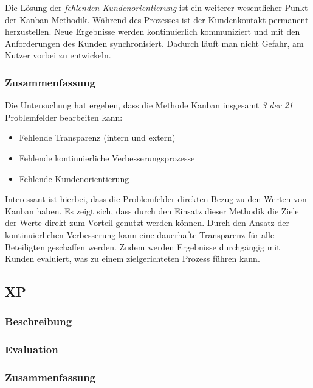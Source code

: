 Die Lösung der \textit{fehlenden Kundenorientierung} ist ein weiterer wesentlicher Punkt der Kanban-Methodik. Während des Prozesses ist der Kundenkontakt permanent herzustellen. Neue Ergebnisse werden kontinuierlich kommuniziert und mit den Anforderungen des Kunden synchronisiert. Dadurch läuft man nicht Gefahr, am Nutzer vorbei zu entwickeln.


\subsubsection{Zusammenfassung}

Die Untersuchung hat ergeben, dass die Methode Kanban insgesamt \textit{3 der 21} Problemfelder bearbeiten kann:

\begin{itemize}[noitemsep, topsep=0pt]
	\item Fehlende Transparenz (intern und extern)
	\item Fehlende kontinuierliche Verbesserungsprozesse
	\item Fehlende Kundenorientierung
\end{itemize}

Interessant ist hierbei, dass die Problemfelder direkten Bezug zu den Werten von Kanban haben. Es zeigt sich, dass durch den Einsatz dieser Methodik die Ziele der Werte direkt zum Vorteil genutzt werden können. Durch den Ansatz der kontinuierlichen Verbesserung kann eine dauerhafte Transparenz für alle Beteiligten geschaffen werden. Zudem werden Ergebnisse durchgängig mit Kunden evaluiert, was zu einem  zielgerichteten Prozess führen kann.  

\subsection{XP}

\subsubsection{Beschreibung}

\todots

\subsubsection{Evaluation}

\todots

\subsubsection{Zusammenfassung}

